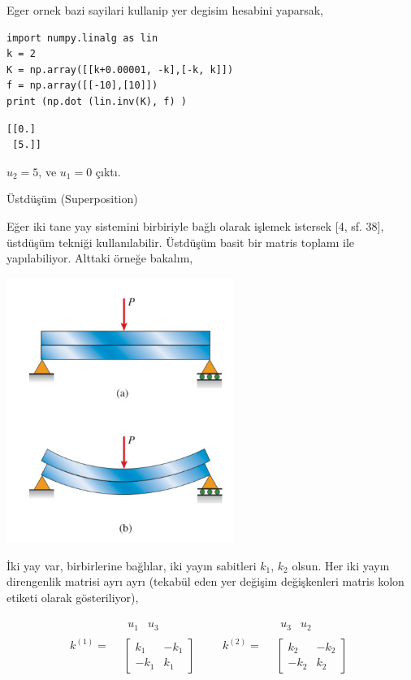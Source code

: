 \documentclass[12pt,fleqn]{article}\usepackage{../../common}
\begin{document}
Eger ornek bazi sayilari kullanip yer degisim hesabini yaparsak,

\begin{verbatim}
import numpy.linalg as lin
k = 2
K = np.array([[k+0.00001, -k],[-k, k]])
f = np.array([[-10],[10]])
print (np.dot (lin.inv(K), f) )
\end{verbatim}

\begin{verbatim}
[[0.]
 [5.]]
\end{verbatim}

$u_2 = 5$, ve $u_1 = 0$ çıktı.

Üstdüşüm (Superposition)

Eğer iki tane yay sistemini birbiriyle bağlı olarak işlemek istersek [4, sf. 38],
üstdüşüm tekniği kullanılabilir. Üstdüşüm basit bir matris toplamı ile
yapılabiliyor. Alttaki örneğe bakalım,

\includegraphics[width=20em]{phy_020_strs_02_02.jpg}

İki yay var, birbirlerine bağlılar, iki yayın sabitleri $k_1$, $k_2$
olsun. Her iki yayın direngenlik matrisi ayrı ayrı (tekabül eden yer değişim
değişkenleri matris kolon etiketi olarak gösteriliyor),

$$
k^{(1)} =
\begin{array}{cc} & \begin{array}{cc} u_1 & u_3 \end{array} \\ &
\left[
\begin{array}{cc}
k_1 & -k_1 \\ -k_1 & k_1
\end{array}
\right]
\end{array} 
\qquad
k^{(2)} =
\begin{array}{cc} & \begin{array}{cc} u_3 & u_2 \end{array} \\ &
\left[
\begin{array}{cc}
k_2 & -k_2 \\ -k_2 & k_2
\end{array}
\right]
\end{array}
$$
\end{document}
